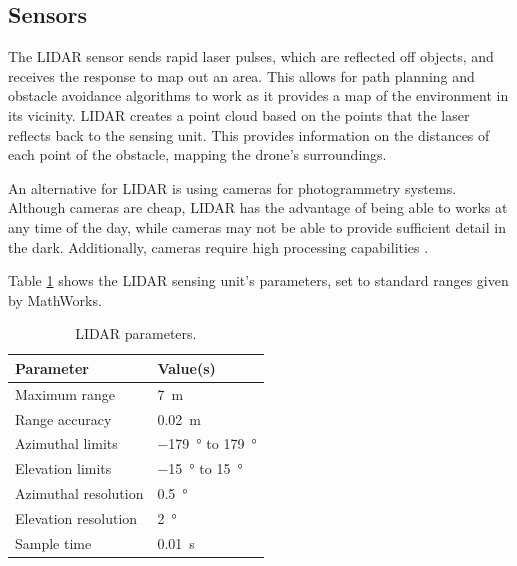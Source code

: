 \subsection{Sensors}
The LIDAR sensor sends rapid laser pulses, which are reflected off objects, and receives the response to map out an area. This allows for path planning and obstacle avoidance algorithms to work as it provides a map of the environment in its vicinity. LIDAR creates a point cloud based on the points that the laser reflects back to the sensing unit. This provides information on the distances of each point of the obstacle, mapping the drone’s surroundings.

An alternative for LIDAR is using cameras for photogrammetry systems. Although cameras are cheap, LIDAR has the advantage of being able to works at any time of the day, while cameras may not be able to provide sufficient detail in the dark. Additionally, cameras require high processing capabilities \cite{9278591}.  

Table \ref{tab:zain3} shows the LIDAR sensing unit’s parameters, set to standard ranges given by MathWorks. 
\begin{table}[H]
    \centering
    \begin{tabular}{@{}ll@{}}
        \toprule
        \textbf{Parameter} & \textbf{Value(s)}\\
        \midrule
        Maximum range & \SI{7}{\meter}\\
        Range accuracy & \SI{0.02}{\meter}\\
        Azimuthal limits & \SI{-179}{\degree} to \SI{179}{\degree}\\
        Elevation limits & \SI{-15}{\degree} to \SI{15}{\degree}\\
        Azimuthal resolution & \SI{0.5}{\degree}\\
        Elevation resolution & \SI{2}{\degree}\\
        Sample time & \SI{0.01}{\second}\\
        \bottomrule
    \end{tabular}
    \caption{LIDAR parameters.}
    \label{tab:zain3}
\end{table}
